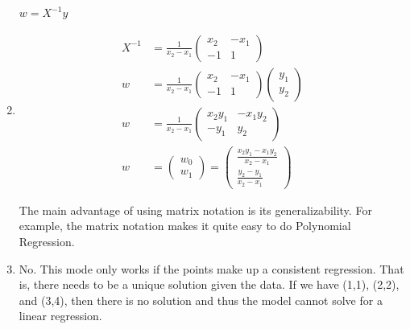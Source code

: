 \documentclass{harvardml}
\theoremstyle{definition}
\theoremstyle{plain}
\begin{document}
\begin{solution}
\begin{enumerate}
    $w = X^{-1}y$
    \item 
    \begin{align*}
    X^{-1} &= \frac{1}{x_2-x_1}\begin{pmatrix} x_2 & -x_1 \\ -1 & 1\end{pmatrix}\\
    w &= \frac{1}{x_2-x_1}\begin{pmatrix} x_2 & -x_1 \\ -1 & 1\end{pmatrix} \begin{pmatrix} y_1 \\ y_2\end{pmatrix}\\
    w &= \frac{1}{x_2-x_1}\begin{pmatrix} x_2y_1 & -x_1y_2 \\ -y_1 & y_2\end{pmatrix}\\
    w &= \begin{pmatrix} w_0 \\ w_1\end{pmatrix} = \begin{pmatrix} \frac{x_2y_1-x_1y_2}{x_2-x_1} \\ \frac{y_2-y_1}{x_2-x_1}\end{pmatrix}
    \end{align*}

    The main advantage of using matrix notation is its generalizability. For example,
    the matrix notation makes it quite easy to do Polynomial Regression.
    \item No. This mode only works if the points make up a consistent regression.
    That is, there needs to be a unique solution given the data. If we have (1,1), (2,2), and (3,4),
    then there is no solution and thus the model cannot solve for a linear regression.


\end{enumerate}
\end{solution}
\end{document}
